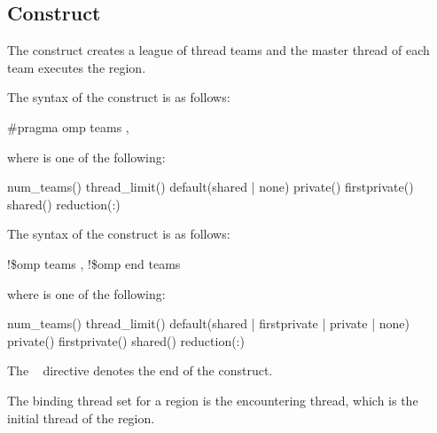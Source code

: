 {{{{\subsection{ Construct}
\label{subsec:teams Construct}
\summary
The  construct creates a league of thread teams and the master thread of each 
team executes the region.

\syntax
\ccppspecificstart
The syntax of the  construct is as follows:

\begin{boxedcode}
\#pragma omp teams \plc{[clause[ [},\plc{] clause] ... ] new-line}
\end{boxedcode}

where  is one of the following:

\begin{indentedcodelist}
num\_teams()
thread\_limit()
default(shared \textnormal{|} none)
private()
firstprivate()
shared()
reduction(:)
\end{indentedcodelist}
\ccppspecificend

\fortranspecificstart
The syntax of the  construct is as follows:

\begin{boxedcode}
!\$omp teams \plc{[clause[ [},\plc{] clause] ... ]}
!\$omp end teams
\end{boxedcode}

where  is one of the following:

\begin{indentedcodelist}
num\_teams()
thread\_limit()
default(shared \textnormal{|} firstprivate \textnormal{|} private \textnormal{|} none)
private()
firstprivate()
shared()
reduction(:)
\end{indentedcodelist}

The ~ directive denotes the end of the  construct.
\fortranspecificend

\begin{samepage}

\binding
The binding thread set for a  region is the encountering thread,
which is the initial thread of the  region.


\end{samepage}}}}}
